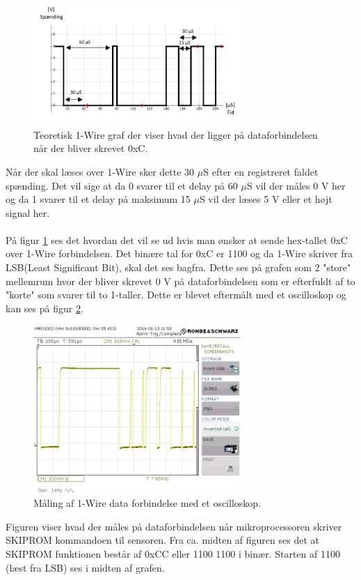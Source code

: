 \begin{figure}[h!]
  \centering
  \includegraphics[width=0.7\textwidth]{figures/onewire.png}
  \caption{Teoretisk 1-Wire graf der viser hvad der ligger på dataforbindelsen når der bliver skrevet 0xC.}
  \label{onewire_graph}
\end{figure}
Når der skal læses over 1-Wire sker dette 30 $\mu$S efter en registreret faldet spænding. Det vil sige at da 0 svarer til et delay på 60 $\mu$S vil der måles 0 V her og da 1 svarer til et delay på maksimum 15 $\mu$S vil der læses 5 V eller et højt signal her.
\\
\\
På figur \ref{onewire_graph} ses det hvordan det vil se ud hvis man ønsker at sende hex-tallet 0xC over 1-Wire forbindelsen. Det binære tal for 0xC er 1100 og da 1-Wire skriver fra LSB(Least Significant Bit), skal det ses bagfra. Dette ses på grafen som 2 "store" mellemrum hvor der bliver skrevet 0 V på dataforbindelsen som er efterfuldt af to "korte" som svarer til to 1-taller. \newline Dette er blevet eftermålt med et oscilloskop og kan ses på figur \ref{SCR02}.


\begin{figure}[h!]
  \centering
  \includegraphics[width=0.7\textwidth]{figures/SCR02.png}
  \caption{Måling af 1-Wire data forbindelse med et oscilloskop.}
  \label{SCR02}
\end{figure}

Figuren viser hvad der måles på dataforbindelsen når mikroprocessoren skriver SKIPROM kommandoen til sensoren.
Fra ca. midten af figuren ses det at SKIPROM funktionen består af 0xCC eller 1100 1100 i binær. Starten af 1100 (læst fra LSB) ses i midten af grafen.